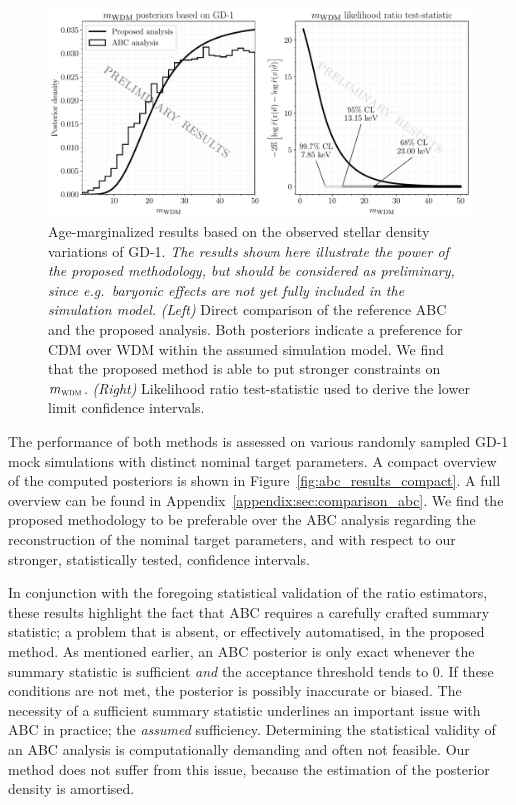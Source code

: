 \documentclass[fleqn,usenatbib]{mnras}
\begin{document}
\begin{figure}
    \centering
    \includegraphics[width=\linewidth]{figures/gd1-summary}
    \caption{Age-marginalized results based on the observed stellar density variations of GD-1.
    \emph{The results shown here illustrate the power of the proposed methodology, but should be considered as preliminary, since e.g.~baryonic effects are not yet fully included in the simulation model.}
    \emph{(Left)} Direct comparison of the reference ABC and the proposed analysis. Both posteriors indicate a preference for CDM over WDM within
    the assumed simulation model. We find that the proposed method is able to put stronger constraints on $m_\textsc{wdm}$. 
    \emph{(Right)} Likelihood ratio test-statistic used to derive the lower limit confidence intervals.
    ~~\protect{}}
    \label{fig:gd1_posteriors}
\end{figure}
The performance of both methods is assessed on various randomly sampled GD-1 mock simulations
with distinct nominal target parameters.
A compact overview of the computed posteriors is shown in Figure~\ref{fig:abc_results_compact}. A full overview can be found in Appendix~\ref{appendix:sec:comparison_abc}.
We find the proposed methodology to be preferable over the ABC analysis regarding the reconstruction of the nominal target parameters, and with respect to our stronger, statistically tested, confidence intervals.

In conjunction with the foregoing statistical validation of the ratio estimators, 
these results highlight the fact that ABC requires a carefully crafted summary statistic;
a problem that is absent, or effectively automatised, in the proposed method.
As mentioned earlier, an ABC posterior is only exact whenever the summary statistic is sufficient
\emph{and} the acceptance threshold tends to 0. If these conditions are not met,
the posterior is possibly inaccurate or biased.
The necessity of a sufficient summary statistic
underlines an important issue with ABC in practice;
the \emph{assumed} sufficiency. Determining the statistical
validity of an ABC analysis is computationally demanding and often not feasible.
Our method does not suffer from this issue, because the estimation of the
posterior density is amortised.
\end{document}
